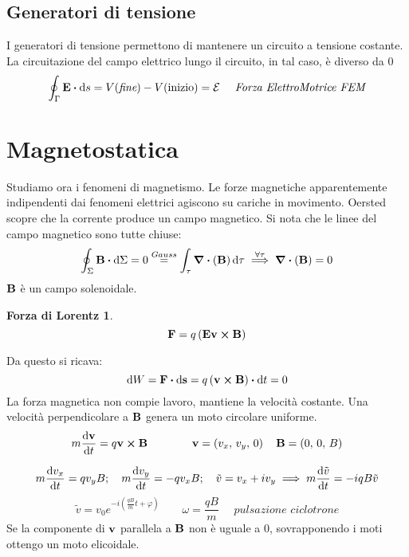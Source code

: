 \documentclass[12pt,a4paper]{article}
\begin{document}
\subsection{Generatori di tensione}
I generatori di tensione permettono di mantenere un circuito a tensione costante.
La circuitazione del campo elettrico lungo il circuito, in tal caso, è diverso da 0
\begin{equation*}
    \oint_\Gamma \vb{E}\vdot\dd{s}= V(\textit{fine})-V(\text{inizio}) = \mathcal{E}\quad \textit{      Forza ElettroMotrice FEM}
\end{equation*} 



\section{Magnetostatica}
Studiamo ora i fenomeni di magnetismo. Le forze magnetiche apparentemente indipendenti dai fenomeni elettrici agiscono su cariche in movimento.
Oersted scopre che la corrente produce un campo magnetico.
Si nota che le linee del campo magnetico sono tutte chiuse:
\begin{equation*}
    \oint_\Sigma \vb{B}\vdot\dd{\Sigma} = 0 \overset{Gauss}{=} \int_\tau \div(\vb{B}) \dd{\tau} \overset{\forall \tau}{\implies} \div(\vb{B})= 0
\end{equation*}
$\vb{B}$ è un campo solenoidale.

\newtheorem*{FL}{Forza di Lorentz}
\begin{FL}
    \begin{equation*}
        \vb{F}= q \left( \vb{E} \vb{v}\cp \vb{B} \right)
    \end{equation*}
\end{FL}

Da questo si ricava:
\begin{equation*}
    \dd{W}= \vb{F}\vdot\dd{\vb{s}}= q\left( \vb{v}\cp \vb{B}\right) \vdot \dd{t} = 0
\end{equation*}
La forza magnetica non compie lavoro, mantiene la velocità costante.
Una velocità perpendicolare a $\vb{B}$ genera un moto circolare uniforme.
\begin{equation*}
    m\dv{\vb{v}}{t}= q\vb{v}\cp \vb{B}\qquad\qquad \vb{v}= \left( v_x,\,v_y,\,0 \right)\quad \vb{B}= \left( 0,\,0,\,B \right)
\end{equation*}

\begin{equation*}
    m\dv{v_x}{t}=qv_yB; \quad m\dv{v_y}{t}= -qv_xB; \quad\tilde{v}= v_x + iv_y \implies m\dv{\tilde{v}}{t}= -iqB\tilde{v}
\end{equation*}
\begin{equation*}
    \tilde{v}= v_0e^{-i\left( \frac{qB}{m}t+\varphi \right)} \qquad \omega= \frac{qB}{m}\quad \textit{ pulsazione ciclotrone}
\end{equation*}
Se la componente di $\vb{v}$ parallela a $\vb{B}$ non è uguale a 0, sovrapponendo i moti ottengo un moto elicoidale.
\end{document}
